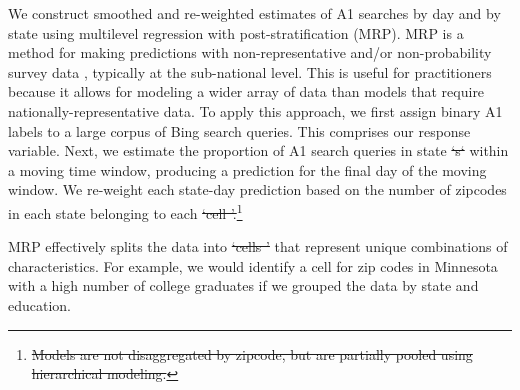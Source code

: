 \documentclass[fleqn,10pt]{wlscirep}
\providecommand{\DIFadd}[1]{{\protect\color{blue}\uwave{#1}}} %
\providecommand{\DIFdel}[1]{{\protect\color{red}\sout{#1}}}                      %
\providecommand{\DIFaddbegin}{} %
\providecommand{\DIFaddend}{} %
\providecommand{\DIFdelbegin}{} %
\providecommand{\DIFdelend}{} %
\begin{document}
We construct smoothed and re-weighted estimates of A1 searches by day and by state using multilevel regression with post-stratification (MRP). MRP is a method for making predictions with non-representative and/or non-probability survey data \cite{park_gelman_bafumi_2004}, typically at the sub-national level. This is useful for practitioners because it allows for modeling a wider array of data than models that require nationally-representative data. To apply this approach, we first assign binary A1 labels to a large corpus of Bing search queries. This comprises our response variable. Next, we estimate the proportion of A1 search queries in state \DIFdelbegin \DIFdel{`s` }\DIFdelend \DIFaddbegin \DIFadd{$s$ }\DIFaddend within a moving time window, producing a prediction for the final day of the moving window. We re-weight each state-day prediction based on the number of zipcodes in each state belonging to each \DIFdelbegin \DIFdel{`cell '.}\footnote{\DIFdel{Models are not disaggregated by zipcode, but are partially pooled using hierarchical modeling.}} %
\addtocounter{footnote}{-1}%
\DIFdelend \DIFaddbegin \DIFadd{cell (stratum).} \DIFaddend MRP effectively splits the data into \DIFdelbegin \DIFdel{`cells ' }\DIFdelend \DIFaddbegin \DIFadd{cells }\DIFaddend that represent unique combinations of characteristics. For example, we would identify a cell for zip codes in Minnesota with a high number of college graduates if we grouped the data by state and education.  

\DIFdelbegin %
\end{document}
